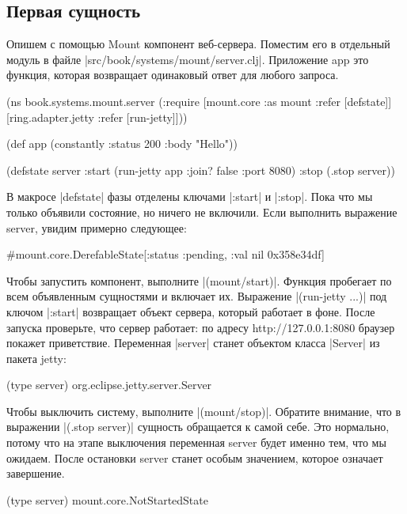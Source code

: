 \subsection{Первая сущность}

Опишем с помощью Mount компонент веб-сервера. Поместим его в отдельный модуль в
файле \spverb|src/book/systems/mount/server.clj|. Приложение app это функция, которая
возвращает одинаковый ответ для любого запроса.

\begin{code}
(ns book.systems.mount.server
  (:require
   [mount.core :as mount :refer [defstate]]
   [ring.adapter.jetty :refer [run-jetty]]))

(def app (constantly {:status 200 :body "Hello"}))

(defstate server
  :start (run-jetty app {:join? false :port 8080})
  :stop (.stop server))
\end{code}

В макросе \spverb|defstate| фазы отделены ключами \spverb|:start| и \spverb|:stop|. Пока что мы
только объявили состояние, но ничего не включили. Если выполнить выражение
server, увидим примерно следующее:

\begin{code}
#mount.core.DerefableState[{:status :pending, :val nil} 0x358e34df]
\end{code}

Чтобы запустить компонент, выполните \spverb|(mount/start)|. Функция пробегает по всем
объявленным сущностями и включает их. Выражение \spverb|(run-jetty ...)| под ключом
\spverb|:start| возвращает объект сервера, который работает в фоне. После запуска
проверьте, что сервер работает: по адресу http://127.0.0.1:8080 браузер покажет
приветствие. Переменная \spverb|server| станет объектом класса \spverb|Server| из пакета
jetty:

\begin{code}
(type server)
org.eclipse.jetty.server.Server
\end{code}

Чтобы выключить систему, выполните \spverb|(mount/stop)|. Обратите внимание, что в
выражении \spverb|(.stop server)| сущность обращается к самой себе. Это нормально,
потому что на этапе выключения переменная server будет именно тем, что мы
ожидаем. После остановки server станет особым значением, которое означает
завершение.

\begin{code}
(type server)
mount.core.NotStartedState
\end{code}

